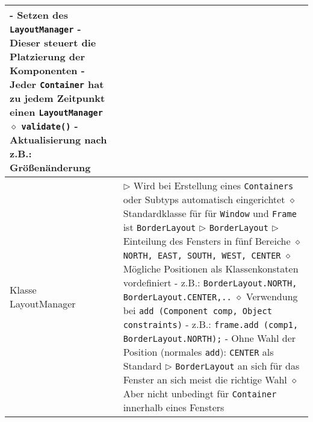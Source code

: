 \begin{longtable}{ | p{} p{} | }
{	\hspace{0.6cm} - Setzen des \texttt{LayoutManager} \\
	\hspace{0.6cm} - Dieser steuert die Platzierung der Komponenten \\ 
	\hspace{0.6cm} - Jeder \texttt{Container} hat zu jedem Zeitpunkt einen \texttt{LayoutManager} \\
	\hspace{0.4cm} $\diamond$ \texttt{validate()} \\
	\hspace{0.6cm} - Aktualisierung nach z.B.: Grö\ss enänderung } \\ \hline

	\makecell[l]{Klasse \\ LayoutManager} & \makecell[l]{
	$\rhd$ Wird bei Erstellung eines \texttt{Containers} oder Subtyps automatisch eingerichtet \\
	\hspace{0.4cm} $\diamond$ Standardklasse für für \texttt{Window} und \texttt{Frame} ist \texttt{BorderLayout} \\
	$\rhd$ \texttt{BorderLayout} \\
	$\rhd$ Einteilung des Fensters in fünf Bereiche \\
	\hspace{0.4cm} $\diamond$ \texttt{NORTH, EAST, SOUTH, WEST, CENTER} \\
	\hspace{0.4cm} $\diamond$ Mögliche Positionen als Klassenkonstaten vordefiniert \\
	\hspace{0.6cm} - z.B.: \texttt{BorderLayout.NORTH, BorderLayout.CENTER,..} \\
	\hspace{0.4cm} $\diamond$ Verwendung bei \texttt{add (Component comp, Object constraints)} \\
	\hspace{0.6cm} - z.B.: \texttt{frame.add (comp1, BorderLayout.NORTH);} \\
	\hspace{0.6cm} - Ohne Wahl der Position (normales \texttt{add}): \texttt{CENTER} als Standard \\
	$\rhd$ \texttt{BorderLayout} an sich für das Fenster an sich meist die richtige Wahl \\
	\hspace{0.4cm} $\diamond$ Aber nicht unbedingt für \texttt{Container} innerhalb eines Fensters \\
}
\end{longtable}
